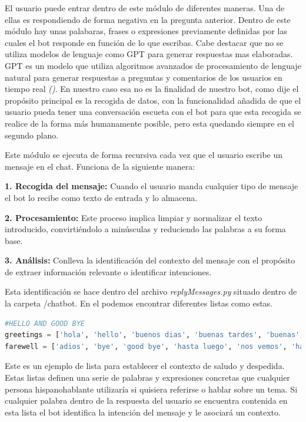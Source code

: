 El usuario puede entrar dentro de este módulo de diferentes maneras. Una de ellas es respondiendo de forma negativa en la pregunta anterior. Dentro de este módulo hay unas palabaras, frases o expresiones previamente definidas por las cuales el bot responde en función de lo que escribas. Cabe destacar que no se utiliza modelos de lenguaje como GPT para generar respuestas mas elaboradas. GPT es un modelo que utiliza algoritmos avanzados de procesamiento de lenguaje natural para generar respuestas a preguntas y comentarios de los usuarios en tiempo real \textit{(\cite{gpt2020})}. En nuestro caso esa no es la finalidad de nuestro bot, como dije el propósito principal es la recogida de datos, con la funcionalidad añadida de que el usuario pueda tener una conversación escueta con el bot para que esta recogida se realice de la forma más humanamente posible, pero esta quedando siempre en el segundo plano. 

Este módulo se ejecuta de forma recursiva cada vez que el usuario escribe un mensaje en el chat. Funciona de la siguiente manera:\vspace{0.3cm}

\textbf{1. Recogida del mensaje: }Cuando el usuario manda cualquier tipo de mensaje el bot lo recibe como texto de entrada y lo almacena.\vspace{0.3cm}

\textbf{2. Procesamiento: }Este proceso implica limpiar y normalizar el texto introducido, convirtiéndolo a minúsculas y reduciendo las palabras a su forma base. \vspace{0.3cm}

\textbf{3. Análisis: }Conlleva la identificación del contexto del mensaje con el propósito de extraer información relevante o identificar intenciones. 

Esta identificación se hace dentro del archivo \textit{replyMessages.py} situado dentro de la carpeta /chatbot. En el podemos encontrar diferentes listas como estas.

\begin{lstlisting}[language=Python]
#HELLO AND GOOD BYE
greetings = ['hola', 'hello', 'buenos dias', 'buenas tardes', 'buenas', 'saludos', 'hi', 'good']
farewell = ['adios', 'bye', 'good bye', 'hasta luego', 'nos vemos', 'hasta pronto', 'buenas noches', 'que tengas un buen dia', 'hasta la proxima','que vaya bien']

\end{lstlisting}

Este es un ejemplo de lista para establecer el contexto de saludo y despedida. Estas listas definen una serie de palabras y expresiones concretas que cualquier persona hispanohablante utilizaría si quisiera referirse o hablar sobre un tema. Si cualquier palabra dentro de la respuesta del usuario se encuentra contenida en esta lista el bot identifica la intención del mensaje y le asociará un contexto.\vspace{0.3cm}

